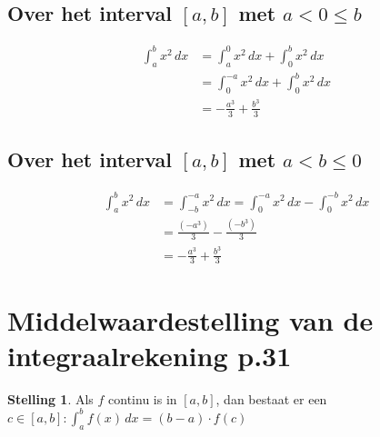\documentclass{article}
\theoremstyle{definition}
\newtheorem*{Stelling}{Stelling}
\begin{document}
\subsection{Over het interval $\left[a,b\right]$ met $a<0\leq b$}
\begin{align*}
  \displaystyle\int_{a}^{b}x^2\,dx&=\displaystyle\int_{a}^{0}x^2\,dx + \displaystyle\int_{0}^{b}x^2\,dx\\
                                  &=\displaystyle\int_{0}^{-a}x^2\,dx + \displaystyle\int_{0}^{b}x^2\,dx\\
                                  &=-\frac{a^3}{3} + \frac{b^3}{3}
\end{align*}
\subsection{Over het interval $\left[a,b\right]$ met $a<b\leq 0$}
\begin{align*}  
\displaystyle\int_{a}^{b}x^2\, dx &= \displaystyle\int_{-b}^{-a}x^2\,dx = \displaystyle\int_{0}^{-a}x^2\, dx - \displaystyle\int_{0}^{-b}x^2\,dx\\
                                  &=\frac{\left(-a^3\right)}{3}-\frac{\left(-b^3\right)}{3}\\
                                  &=-\frac{a^3}{3}+\frac{b^3}{3}
\end{align*}
\section{Middelwaardestelling van de integraalrekening p.31}
\begin{Stelling}
  Als $f$ continu is in $\left[a,b\right]$, dan bestaat er een $c \in \left[a, b\right]: \displaystyle\int_{a}^{b}f\left(x\right)\,dx = \left(b-a\right)\cdot f\left(c\right)$
\end{Stelling}
\end{document}
